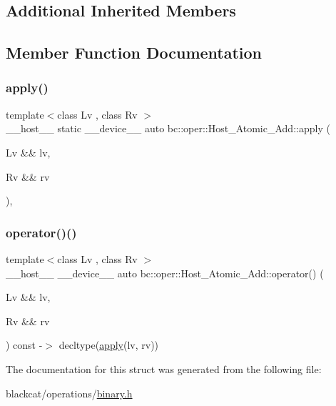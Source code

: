 \subsection*{Additional Inherited Members}


\subsection{Member Function Documentation}
\mbox{\label{structbc_1_1oper_1_1Host__Atomic__Add_a95e2db6c170aec5d0eb6066cf74f32c2}} 
\subsubsection{\texorpdfstring{apply()}{apply()}}
{\footnotesize\ttfamily template$<$class Lv , class Rv $>$ \\
\+\_\+\+\_\+host\+\_\+\+\_\+ static \+\_\+\+\_\+device\+\_\+\+\_\+ auto bc\+::oper\+::\+Host\+\_\+\+Atomic\+\_\+\+Add\+::apply (\begin{DoxyParamCaption}\item[{Lv \&\&}]{lv,  }\item[{Rv \&\&}]{rv }\end{DoxyParamCaption})\hspace{0.3cm}{\ttfamily [inline]}, {\ttfamily [static]}}

\mbox{\label{structbc_1_1oper_1_1Host__Atomic__Add_a8d52bfde9f8437b8b36a87e8b7831557}} 
\subsubsection{\texorpdfstring{operator()()}{operator()()}}
{\footnotesize\ttfamily template$<$class Lv , class Rv $>$ \\
\+\_\+\+\_\+host\+\_\+\+\_\+ \+\_\+\+\_\+device\+\_\+\+\_\+ auto bc\+::oper\+::\+Host\+\_\+\+Atomic\+\_\+\+Add\+::operator() (\begin{DoxyParamCaption}\item[{Lv \&\&}]{lv,  }\item[{Rv \&\&}]{rv }\end{DoxyParamCaption}) const -\/$>$ decltype(\hyperlink{structbc_1_1oper_1_1Host__Atomic__Add_a95e2db6c170aec5d0eb6066cf74f32c2}{apply}(lv, rv)) \hspace{0.3cm}{\ttfamily [inline]}}



The documentation for this struct was generated from the following file\+:\begin{DoxyCompactItemize}
\item 
blackcat/operations/\hyperlink{binary_8h}{binary.\+h}\end{DoxyCompactItemize}
